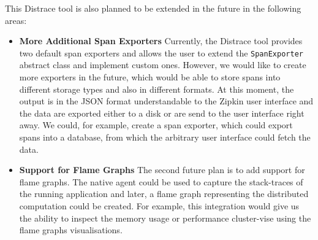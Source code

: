 This Distrace tool is also planned to be extended in the future in the following areas:
\begin{itemize}
	\item \textbf{More Additional Span Exporters} \newline
	Currently, the Distrace tool provides two default span exporters and allows the user to extend the \texttt{SpanExporter} abstract class and implement custom ones. However, we would like to create more exporters in the future, which would be able to store spans into different storage types and also in different formats. At this moment, the output is in the JSON format understandable to the Zipkin user interface and the data are exported either to a disk or are send to the user interface right away. We could, for example, create a span exporter, which could export spans into a database, from which the arbitrary user interface could fetch the data.
	\item \textbf{Support for Flame Graphs} \newline
	The second future plan is to add support for flame graphs. The native agent could be used to capture the stack-traces of the running application and later, a flame graph representing the distributed computation could be created. For example, this integration would give us the ability to inspect the memory usage or performance cluster-vise using the flame graphs visualisations.
\end{itemize}


